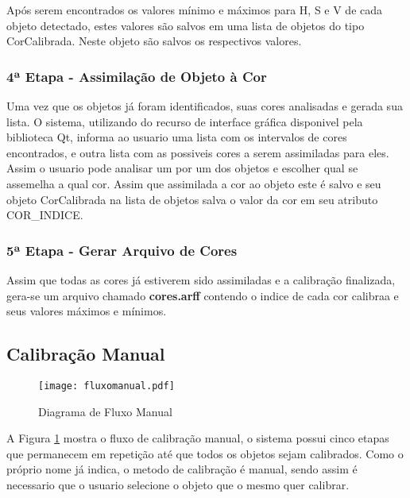 Após serem encontrados os valores mínimo e máximos para H, S e V de cada objeto detectado, estes valores são salvos em uma lista de objetos do tipo CorCalibrada. Neste objeto são salvos os respectivos valores.

 \subsubsection{4ª Etapa - Assimilação de Objeto à Cor}
 Uma vez que os objetos já foram identificados, suas cores analisadas e gerada sua lista. O sistema, utilizando do recurso de interface gráfica disponivel pela biblioteca Qt, informa ao usuario uma lista com os intervalos de cores encontrados, e outra lista com as possiveis cores a serem assimiladas para eles. Assim o usuario pode analisar um por um dos objetos e escolher qual se assemelha a qual cor. Assim que assimilada a cor ao objeto este é salvo e seu objeto CorCalibrada na lista de objetos salva o valor da cor em seu atributo COR\_INDICE.
 
  \subsubsection{5ª Etapa - Gerar Arquivo de Cores}
  Assim que todas as cores já estiverem sido assimiladas e a calibração finalizada, gera-se um arquivo chamado \textbf{cores.arff} contendo o indice de cada cor calibraa e seus valores máximos e mínimos.
  
  		
  	\subsection{Calibração Manual}
  	
  	  		\begin{figure}[!h]
  	  				\centering
  	  				\texttt{[image: fluxomanual.pdf]}
  	  				\caption{Diagrama de Fluxo Manual}
  	  				\label{DiagramaDeFluxoManual}
  	  			\end{figure}
  	  		
  	  			
   A Figura \ref{DiagramaDeFluxoManual} mostra o fluxo de calibração manual, o sistema possui cinco etapas que permanecem em repetição até que todos os objetos sejam calibrados. Como o próprio nome já indica, o metodo de calibração é manual, sendo assim é necessario que o usuario selecione o objeto que o mesmo quer calibrar.
	
